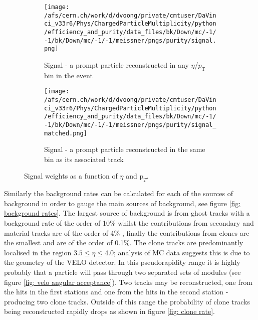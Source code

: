 \begin{figure}
	\centering
	\begin{subfigure}{0.49\textwidth}
		\texttt{[image: /afs/cern.ch/work/d/dvoong/private/cmtuser/DaVinci\_v33r6/Phys/ChargedParticleMultiplicity/python/efficiency\_and\_purity/data\_files/bk/Down/mc/-1/-1/bk/Down/mc/-1/-1/meissner/pngs/purity/signal.png]}
		\caption{Signal - a prompt particle reconstructed in any $\eta$/$p_\mathrm{T}$ bin in the event}
		\label{fig: signal weight}
	\end{subfigure}
	\begin{subfigure}{0.49\textwidth}
		\texttt{[image: /afs/cern.ch/work/d/dvoong/private/cmtuser/DaVinci\_v33r6/Phys/ChargedParticleMultiplicity/python/efficiency\_and\_purity/data\_files/bk/Down/mc/-1/-1/bk/Down/mc/-1/-1/meissner/pngs/purity/signal\_matched.png]}
		\caption{Signal - a prompt particle reconstructed in the same bin as its associated track}
		\label{fig: signal matched weight}
	\end{subfigure}
	\caption{Signal weights as a function of $\eta$ and $\mathrm{p}_T$.}
	\label{fig: signal weights}
\end{figure}

Similarly the background rates can be calculated for each of the sources of background in order to gauge the main sources of background, see figure \ref{fig: background rates}. The largest source of background is from ghost tracks with a background rate of the order of 10\% whilst the contributions from secondary and material tracks are of the order of 4\% , finally the contributions from clones are the smallest and are of the order of 0.1\%. The clone tracks are predominantly localised in the region $3.5 \le \eta \le 4.0$; analysis of MC data suggests this is due to the geometry of the VELO detector. In this pseudorapidity range it is highly probably that a particle will pass through two separated sets of modules (see figure \ref{fig: velo angular acceptance}). Two tracks may be reconstructed, one from the hits in the first stations and one from the hits in the second station - producing two clone tracks. Outside of this range the probability of clone tracks being reconstructed rapidly drops as shown in figure \ref{fig: clone rate}.

